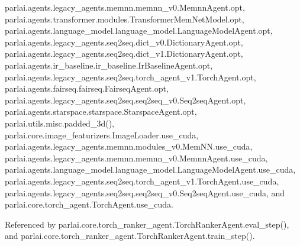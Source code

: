 parlai.\+agents.\+legacy\+\_\+agents.\+memnn.\+memnn\+\_\+v0.\+Memnn\+Agent.\+opt, parlai.\+agents.\+transformer.\+modules.\+Transformer\+Mem\+Net\+Model.\+opt, parlai.\+agents.\+language\+\_\+model.\+language\+\_\+model.\+Language\+Model\+Agent.\+opt, parlai.\+agents.\+legacy\+\_\+agents.\+seq2seq.\+dict\+\_\+v0.\+Dictionary\+Agent.\+opt, parlai.\+agents.\+legacy\+\_\+agents.\+seq2seq.\+dict\+\_\+v1.\+Dictionary\+Agent.\+opt, parlai.\+agents.\+ir\+\_\+baseline.\+ir\+\_\+baseline.\+Ir\+Baseline\+Agent.\+opt, parlai.\+agents.\+legacy\+\_\+agents.\+seq2seq.\+torch\+\_\+agent\+\_\+v1.\+Torch\+Agent.\+opt, parlai.\+agents.\+fairseq.\+fairseq.\+Fairseq\+Agent.\+opt, parlai.\+agents.\+legacy\+\_\+agents.\+seq2seq.\+seq2seq\+\_\+v0.\+Seq2seq\+Agent.\+opt, parlai.\+agents.\+starspace.\+starspace.\+Starspace\+Agent.\+opt, parlai.\+utils.\+misc.\+padded\+\_\+3d(), parlai.\+core.\+image\+\_\+featurizers.\+Image\+Loader.\+use\+\_\+cuda, parlai.\+agents.\+legacy\+\_\+agents.\+memnn.\+modules\+\_\+v0.\+Mem\+N\+N.\+use\+\_\+cuda, parlai.\+agents.\+legacy\+\_\+agents.\+memnn.\+memnn\+\_\+v0.\+Memnn\+Agent.\+use\+\_\+cuda, parlai.\+agents.\+language\+\_\+model.\+language\+\_\+model.\+Language\+Model\+Agent.\+use\+\_\+cuda, parlai.\+agents.\+legacy\+\_\+agents.\+seq2seq.\+torch\+\_\+agent\+\_\+v1.\+Torch\+Agent.\+use\+\_\+cuda, parlai.\+agents.\+legacy\+\_\+agents.\+seq2seq.\+seq2seq\+\_\+v0.\+Seq2seq\+Agent.\+use\+\_\+cuda, and parlai.\+core.\+torch\+\_\+agent.\+Torch\+Agent.\+use\+\_\+cuda.



Referenced by parlai.\+core.\+torch\+\_\+ranker\+\_\+agent.\+Torch\+Ranker\+Agent.\+eval\+\_\+step(), and parlai.\+core.\+torch\+\_\+ranker\+\_\+agent.\+Torch\+Ranker\+Agent.\+train\+\_\+step().

